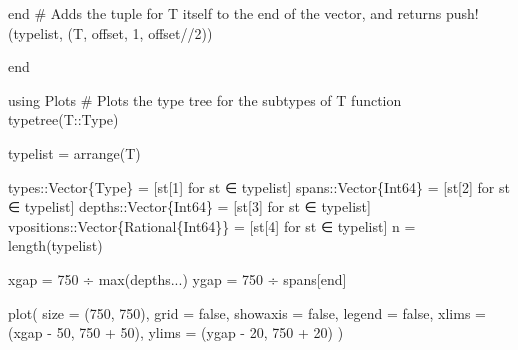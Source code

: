 \documentclass[
  letterpaper,
  DIV=11,
  numbers=noendperiod]{scrreprt}
\newenvironment{Shaded}{\begin{snugshade}}{\end{snugshade}}
\newcommand{\BuiltInTok}[1]{\textcolor[rgb]{0.00,0.23,0.31}{#1}}
\newcommand{\CommentTok}[1]{\textcolor[rgb]{0.37,0.37,0.37}{#1}}
\newcommand{\ConstantTok}[1]{\textcolor[rgb]{0.56,0.35,0.01}{#1}}
\newcommand{\ControlFlowTok}[1]{\textcolor[rgb]{0.00,0.23,0.31}{#1}}
\newcommand{\DataTypeTok}[1]{\textcolor[rgb]{0.68,0.00,0.00}{#1}}
\newcommand{\FloatTok}[1]{\textcolor[rgb]{0.68,0.00,0.00}{#1}}
\newcommand{\FunctionTok}[1]{\textcolor[rgb]{0.28,0.35,0.67}{#1}}
\newcommand{\ImportTok}[1]{\textcolor[rgb]{0.00,0.46,0.62}{#1}}
\newcommand{\KeywordTok}[1]{\textcolor[rgb]{0.00,0.23,0.31}{#1}}
\newcommand{\NormalTok}[1]{\textcolor[rgb]{0.00,0.23,0.31}{#1}}
\newcommand{\OperatorTok}[1]{\textcolor[rgb]{0.37,0.37,0.37}{#1}}
\begin{document}
\begin{Shaded}
\begin{Highlighting}[]
    \ControlFlowTok{end}
    \CommentTok{\# Adds the tuple for T itself to the end of the vector, and returns}
    \FunctionTok{push!}\NormalTok{(typelist, (T, offset, }\FloatTok{1}\NormalTok{, offset}\OperatorTok{//}\FloatTok{2}\NormalTok{))}
    
\KeywordTok{end}

\ImportTok{using} \BuiltInTok{Plots}
\CommentTok{\# Plots the type tree for the subtypes of T}
\KeywordTok{function} \FunctionTok{typetree}\NormalTok{(T}\OperatorTok{::}\DataTypeTok{Type}\NormalTok{)}

\NormalTok{    typelist }\OperatorTok{=} \FunctionTok{arrange}\NormalTok{(T)}

\NormalTok{    types}\OperatorTok{::}\DataTypeTok{Vector\{Type\}                 }\OperatorTok{=}\NormalTok{ [st[}\FloatTok{1}\NormalTok{] for st }\OperatorTok{∈}\NormalTok{ typelist]}
\NormalTok{    spans}\OperatorTok{::}\DataTypeTok{Vector\{Int64\}                }\OperatorTok{=}\NormalTok{ [st[}\FloatTok{2}\NormalTok{] for st }\OperatorTok{∈}\NormalTok{ typelist]}
\NormalTok{    depths}\OperatorTok{::}\DataTypeTok{Vector\{Int64\}               }\OperatorTok{=}\NormalTok{ [st[}\FloatTok{3}\NormalTok{] for st }\OperatorTok{∈}\NormalTok{ typelist]}
\NormalTok{    vpositions}\OperatorTok{::}\DataTypeTok{Vector\{Rational\{Int64\}\} }\OperatorTok{=}\NormalTok{ [st[}\FloatTok{4}\NormalTok{] for st }\OperatorTok{∈}\NormalTok{ typelist]}
\NormalTok{    n }\OperatorTok{=} \FunctionTok{length}\NormalTok{(typelist)}

\NormalTok{    xgap }\OperatorTok{=} \FloatTok{750} \OperatorTok{÷} \FunctionTok{max}\NormalTok{(depths}\OperatorTok{...}\NormalTok{)}
\NormalTok{    ygap }\OperatorTok{=} \FloatTok{750} \OperatorTok{÷}\NormalTok{ spans[}\KeywordTok{end}\NormalTok{]}

    \FunctionTok{plot}\NormalTok{(}
\NormalTok{        size }\OperatorTok{=}\NormalTok{ (}\FloatTok{750}\NormalTok{, }\FloatTok{750}\NormalTok{),}
\NormalTok{        grid }\OperatorTok{=} \ConstantTok{false}\NormalTok{,}
\NormalTok{        showaxis }\OperatorTok{=} \ConstantTok{false}\NormalTok{,}
\NormalTok{        legend }\OperatorTok{=} \ConstantTok{false}\NormalTok{,}
\NormalTok{        xlims }\OperatorTok{=}\NormalTok{ (xgap }\OperatorTok{{-}} \FloatTok{50}\NormalTok{, }\FloatTok{750} \OperatorTok{+} \FloatTok{50}\NormalTok{),}
\NormalTok{        ylims }\OperatorTok{=}\NormalTok{ (ygap }\OperatorTok{{-}} \FloatTok{20}\NormalTok{, }\FloatTok{750} \OperatorTok{+} \FloatTok{20}\NormalTok{)}
\NormalTok{    )}


\end{Highlighting}
\end{Shaded}
\end{document}
